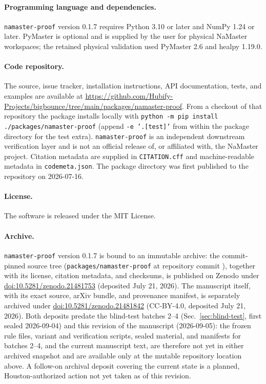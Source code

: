 \documentclass[11pt]{article}
\newcommand{\software}{\texttt{namaster-proof}}
\begin{document}
\paragraph{Programming language and dependencies.}
\software{} version 0.1.7 requires Python 3.10 or later and NumPy 1.24 or later. PyMaster
is optional and is supplied by the user for physical NaMaster workspaces;
the retained physical validation used PyMaster 2.6 and healpy 1.19.0.

\paragraph{Code repository.}
\begingroup\sloppy
The source, issue tracker, installation instructions, API documentation, tests,
and examples are available at
\url{https://github.com/Hubify-Projects/bigbounce/tree/main/packages/namaster-proof}.
From a checkout of that repository the package installs locally with
\texttt{python -m pip install ./packages/namaster-proof} (append
\texttt{-e '.[test]'} from within the package directory for the test extra).
\texttt{namaster-proof} is an independent downstream verification layer and is
not an official release of, or affiliated with, the NaMaster project.
Citation metadata are supplied in \texttt{CITATION.cff} and machine-readable
metadata in \texttt{codemeta.json}. The package directory was first published
to the repository on 2026-07-16.
\par\endgroup

\paragraph{License.}
The software is released under the MIT License.

\paragraph{Archive.}
\software{} version 0.1.7 is bound to an immutable archive: the commit-pinned source tree
(\texttt{packages/namaster-proof} at repository commit
\texttt{}), together with
its license, citation metadata, and checksums, is published on Zenodo under
\href{https://doi.org/10.5281/zenodo.21481753}{doi:10.5281/zenodo.21481753}
(deposited July 21, 2026). The manuscript itself, with its
exact source, arXiv bundle, and provenance manifest, is separately archived
under \href{https://doi.org/10.5281/zenodo.21481842}{doi:10.5281/zenodo.21481842}
(CC-BY-4.0, deposited July 21, 2026). Both deposits predate the blind-test
batches 2--4 (Sec.~\ref{sec:blind-test}, first sealed 2026-09-04) and this
revision of the manuscript (2026-09-05): the frozen rule files, variant and
verification scripts, sealed material, and manifests for batches 2--4, and
the current manuscript text, are therefore not yet in either archived
snapshot and are available only at the mutable repository location above.
A follow-on archival deposit covering the current state is a planned,
Houston-authorized action not yet taken as of this revision.
\end{document}
